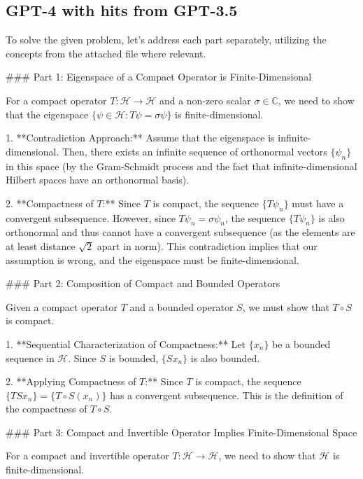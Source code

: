 \documentclass{article}
\begin{document}
\subsection{GPT-4 with hits from GPT-3.5}

To solve the given problem, let's address each part separately, utilizing the concepts from the attached file where relevant.

### Part 1: Eigenspace of a Compact Operator is Finite-Dimensional

For a compact operator \( T: \mathcal{H} \rightarrow \mathcal{H} \) and a non-zero scalar \( \sigma \in \mathbb{C} \), we need to show that the eigenspace \( \{\psi \in \mathcal{H}: T \psi = \sigma \psi\} \) is finite-dimensional.

1. **Contradiction Approach:** Assume that the eigenspace is infinite-dimensional. Then, there exists an infinite sequence of orthonormal vectors \( \{\psi_n\} \) in this space (by the Gram-Schmidt process and the fact that infinite-dimensional Hilbert spaces have an orthonormal basis).

2. **Compactness of \( T \):** Since \( T \) is compact, the sequence \( \{T \psi_n\} \) must have a convergent subsequence. However, since \( T \psi_n = \sigma \psi_n \), the sequence \( \{T \psi_n\} \) is also orthonormal and thus cannot have a convergent subsequence (as the elements are at least distance \( \sqrt{2} \) apart in norm). This contradiction implies that our assumption is wrong, and the eigenspace must be finite-dimensional.

### Part 2: Composition of Compact and Bounded Operators

Given a compact operator \( T \) and a bounded operator \( S \), we must show that \( T \circ S \) is compact.

1. **Sequential Characterization of Compactness:** Let \( \{x_n\} \) be a bounded sequence in \( \mathcal{H} \). Since \( S \) is bounded, \( \{Sx_n\} \) is also bounded.

2. **Applying Compactness of \( T \):** Since \( T \) is compact, the sequence \( \{TSx_n\} = \{T \circ S(x_n)\} \) has a convergent subsequence. This is the definition of the compactness of \( T \circ S \).

### Part 3: Compact and Invertible Operator Implies Finite-Dimensional Space

For a compact and invertible operator \( T: \mathcal{H} \rightarrow \mathcal{H} \), we need to show that \( \mathcal{H} \) is finite-dimensional.
\end{document}
